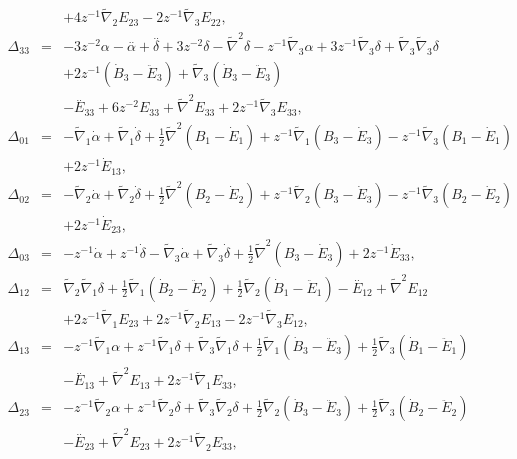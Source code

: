 \begin{eqnarray}
\nonumber\\
&&+ 4 z^{-1} \tilde{\nabla}_{2}E_{23} - 2 z^{-1} \tilde{\nabla}_{3}E_{22},
\nonumber\\ 
\Delta_{33}&=& -3 z^{-2} \alpha -  \overset{..}{\alpha} + \overset{..}{\delta} + 3 z^{-2} \delta -  \tilde\nabla^{2}{}\delta -  z^{-1} \tilde{\nabla}_{3}\alpha + 3 z^{-1} \tilde{\nabla}_{3}\delta + \tilde{\nabla}_{3}\tilde{\nabla}_{3}\delta 
\nonumber\\
&&+2 z^{-1} (\dot{B}_3-\ddot{E}_3) + \tilde{\nabla}_{3}(\dot{B}_3-\ddot{E}_3)
\nonumber \\ 
&&  -\overset{..}{E}_{33}+ 6 z^{-2} E_{33} + \tilde\nabla^{2}{}E_{33} + 2 z^{-1} \tilde{\nabla}_{3}E_{33},
\nonumber\\ 
\Delta_{01}&=& - \tilde{\nabla}_{1}\dot{\alpha} + \tilde{\nabla}_{1}\dot{\delta}+\tfrac{1}{2} \tilde\nabla^{2}{}(B_1-\dot{E}_1) + z^{-1} \tilde{\nabla}_{1}(B_3-\dot{E}_3) -  z^{-1} \tilde{\nabla}_{3}(B_1-\dot{E}_1)
\nonumber\\
&&+2 z^{-1} \dot{E}_{13},
\nonumber\\ 
\Delta_{02}&=& - \tilde{\nabla}_{2}\dot{\alpha} + \tilde{\nabla}_{2}\dot{\delta}+\tfrac{1}{2} \tilde\nabla^{2}{}(B_2-\dot{E}_2) + z^{-1} \tilde{\nabla}_{2}(B_3-\dot{E}_3) -  z^{-1} \tilde{\nabla}_{3}(B_2-\dot{E}_2)
\nonumber\\
&&+2 z^{-1} \dot{E}_{23},
\nonumber\\ 
\Delta_{03}&=& - z^{-1} \dot{\alpha} + z^{-1} \dot{\delta} -  \tilde{\nabla}_{3}\dot{\alpha} + \tilde{\nabla}_{3}\dot{\delta}+\tfrac{1}{2} \tilde\nabla^{2}{}(B_3-\dot{E}_3)+2 z^{-1} \dot{E}_{33},
\nonumber\\ 
\Delta_{12}&=& \tilde{\nabla}_{2}\tilde{\nabla}_{1}\delta +\tfrac{1}{2} \tilde{\nabla}_{1}(\dot{B}_2-\ddot{E}_2) + \tfrac{1}{2} \tilde{\nabla}_{2}(\dot{B}_1-\ddot{E}_1)- \overset{..}{E}_{12} + \tilde\nabla^{2}{}E_{12}
\nonumber\\
&& + 2 z^{-1} \tilde{\nabla}_{1}E_{23} 
+ 2 z^{-1} \tilde{\nabla}_{2}E_{13} - 2 z^{-1} \tilde{\nabla}_{3}E_{12},
\nonumber\\ 
\Delta_{13}&=& - z^{-1} \tilde{\nabla}_{1}\alpha + z^{-1} \tilde{\nabla}_{1}\delta + \tilde{\nabla}_{3}\tilde{\nabla}_{1}\delta +\tfrac{1}{2} \tilde{\nabla}_{1}(\dot{B}_3-\ddot{E}_3) + \tfrac{1}{2} \tilde{\nabla}_{3}(\dot{B}_1-\ddot{E}_1)
\nonumber\\
&&- \overset{..}{E}_{13} 
+ \tilde\nabla^{2}{}E_{13} + 2 z^{-1} \tilde{\nabla}_{1}E_{33},
\nonumber\\ 
\Delta_{23}&=& - z^{-1} \tilde{\nabla}_{2}\alpha + z^{-1} \tilde{\nabla}_{2}\delta + \tilde{\nabla}_{3}\tilde{\nabla}_{2}\delta +\tfrac{1}{2} \tilde{\nabla}_{2}(\dot{B}_3-\ddot{E}_3) + \tfrac{1}{2} \tilde{\nabla}_{3}(\dot{B}_2-\ddot{E}_2)
\nonumber\\
&&- \overset{..}{E}_{23} 
+ \tilde\nabla^{2}{}E_{23} + 2 z^{-1} \tilde{\nabla}_{2}E_{33},
\label{14.4} 
\end{eqnarray}
